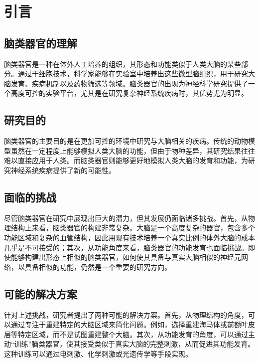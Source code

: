 \chapter{引言}\label{chap:introduction}

\section{脑类器官的理解}\label{sec:brain-organoid}
脑类器官是一种在体外人工培养的组织，其形态和功能类似于人类大脑的某些部分\cite{Kim2023}。通过干细胞技术，科学家能够在实验室中培养出这些微型脑组织，用于研究大脑发育、疾病机制以及药物筛选等领域。脑类器官的出现为神经科学研究提供了一个高度可控的实验平台，尤其是在研究复杂神经系统疾病时，其优势尤为明显。

\section{研究目的}\label{sec:research-purpose}
脑类器官的主要目的是在更加可控的环境中研究与大脑相关的疾病。传统的动物模型虽然在一定程度上能够模拟人类大脑的功能，但由于物种差异，其研究结果往往难以直接应用于人类。而脑类器官则能够更好地模拟人类大脑的发育和功能，为研究神经系统疾病提供了新的可能性。

\section{面临的挑战}\label{sec:research-challenges}
尽管脑类器官在研究中展现出巨大的潜力，但其发展仍面临诸多挑战。首先，从物理结构上来看，脑类器官的构建非常复杂。大脑是一个高度复杂的器官，包含多个功能区域和复杂的血管结构，因此用现有技术培养一个真实比例的体外大脑的成本几乎是不可接受的；其次，从功能角度来看，脑类器官的功能发育也面临挑战。即使能够构建出形态上相似的脑类器官，如何使其具备与真实大脑相似的神经元网络，以具备相似的功能，仍然是一个重要的研究方向。

\section{可能的解决方案}\label{sec:research-solutions}
针对上述挑战，研究者提出了两种可能的解决方案。首先，从物理结构的角度，可以通过专注于重建特定的大脑区域来简化问题。例如，选择重建海马体或前额叶皮层等特定区域，而不是试图重建整个大脑。其次，从功能发育的角度，可以通过主动“训练”脑类器官，使其接受类似于真实大脑的完整刺激，从而促进其功能发育。这种训练可以通过电刺激、化学刺激或光遗传学等手段实现。


